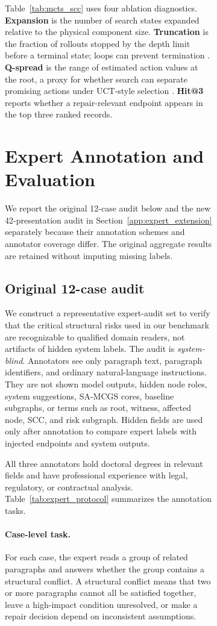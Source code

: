 \documentclass[11pt]{article}
\newcommand{\samcgs}{SA-MCGS}
\newcommand{\scc}{SCC}
\begin{document}
\begin{figure}[!t]
\begin{figure}[!t]
Table~\ref{tab:mcts_scc} uses four ablation diagnostics.  \textbf{Expansion}
is the number of search states expanded relative to the physical
component size.  \textbf{Truncation} is the fraction of rollouts stopped
by the depth limit before a terminal state; loops can prevent termination \citep{moerland2020mcts}.  \textbf{Q-spread} is the range of estimated
action values at the root, a proxy for whether search can separate
promising actions under UCT-style selection \citep{kocsis2006bandit}.
\textbf{Hit@3} reports whether a repair-relevant endpoint appears in the
top three ranked records.

\section{Expert Annotation and Evaluation}
\label{sec:appendix_annotation}

We report the original 12-case audit below and the new 42-presentation audit in Section~\ref{app:expert_extension} separately because their annotation schemes and annotator coverage differ. The original aggregate results are retained without imputing missing labels.
\subsection{Original 12-case audit}

We construct a representative expert-audit set to verify that the critical structural risks used in our benchmark are recognizable to qualified domain readers, not artifacts of hidden system labels.  The audit is \emph{system-blind}.  Annotators see only paragraph text, paragraph identifiers, and ordinary natural-language instructions.  They are not shown model outputs, hidden node roles, system suggestions, \samcgs{} cores, baseline subgraphs, or terms such as root, witness, affected node, \scc{}, and risk subgraph.  Hidden fields are used only after annotation to compare expert labels with injected endpoints and system outputs.

All three annotators hold doctoral degrees in relevant fields and have professional experience with legal, regulatory, or contractual analysis. Table~\ref{tab:expert_protocol} summarizes the annotation tasks.

\paragraph{Case-level task.}
For each case, the expert reads a group of related paragraphs and answers whether the group contains a structural conflict.  A structural conflict means that two or more paragraphs cannot all be satisfied together, leave a high-impact condition unresolved, or make a repair decision depend on inconsistent assumptions.


\end{figure}
\end{figure}
\end{document}
